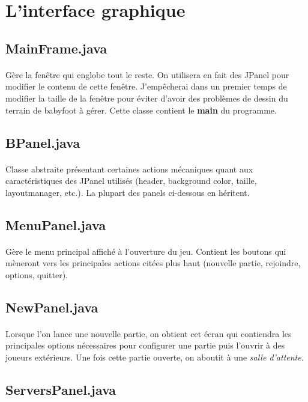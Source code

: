\documentclass[a4paper,12pt]{report}
\begin{document}
\section{L'interface graphique}
\subsection{MainFrame.java}
\paragraph{}
Gère la fenêtre qui englobe tout le reste. On utilisera en fait des JPanel pour modifier le contenu de cette fenêtre. J'empêcherai dans un premier temps de modifier la taille de la fenêtre pour éviter d'avoir des problèmes de dessin du terrain de babyfoot à gérer. Cette classe contient le \textbf{main} du programme.
\subsection{BPanel.java}
\paragraph{}
Classe abstraite présentant certaines actions mécaniques quant aux caractéristiques des JPanel utilisés (header, background color, taille, layoutmanager, etc.). La plupart des panels ci-dessous en héritent.
\subsection{MenuPanel.java}
\paragraph{}
Gère le menu principal affiché à l'ouverture du jeu. Contient les boutons qui mèneront vers les principales actions citées plus haut (nouvelle partie, rejoindre, options, quitter).
\subsection{NewPanel.java}
\paragraph{}
Lorsque l'on lance une nouvelle partie, on obtient cet écran qui contiendra les principales options nécessaires pour configurer une partie puis l'ouvrir à des joueurs extérieurs. Une fois cette partie ouverte, on aboutit à une \emph{salle d'attente}.
\subsection{ServersPanel.java}
\end{document}
